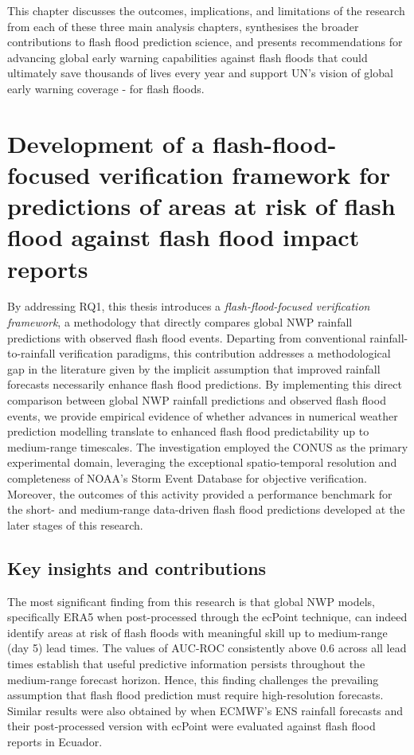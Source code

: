 This chapter discusses the outcomes, implications, and limitations of the research from each of these three main analysis chapters, synthesises the broader contributions to flash flood prediction science, and presents recommendations for advancing global early warning capabilities against flash floods that could ultimately save thousands of lives every year and support UN's vision of global early warning coverage - for flash floods.


\section{Development of a flash-flood-focused verification framework for predictions of areas at risk of flash flood against flash flood impact reports}

By addressing RQ1, this thesis introduces a \textit{flash-flood-focused verification framework}, a methodology that directly compares global NWP rainfall predictions with observed flash flood events. Departing from conventional rainfall-to-rainfall verification paradigms, this contribution addresses a methodological gap in the literature given by the implicit assumption that improved rainfall forecasts necessarily enhance flash flood predictions. By implementing this direct comparison between global NWP rainfall predictions and observed flash flood events, we provide empirical evidence of whether advances in numerical weather prediction modelling translate to enhanced flash flood predictability up to medium-range timescales. The investigation employed the CONUS as the primary experimental domain, leveraging the exceptional spatio-temporal resolution and completeness of NOAA's Storm Event Database for objective verification. Moreover, the outcomes of this activity provided a performance benchmark for the short- and medium-range data-driven flash flood predictions developed at the later stages of this research.


\subsection{Key insights and contributions}

The most significant finding from this research is that global NWP models, specifically ERA5 when post-processed through the ecPoint technique, can indeed identify areas at risk of flash floods with meaningful skill up to medium-range (day 5) lead times. The values of AUC-ROC consistently above 0.6 across all lead times establish that useful predictive information persists throughout the medium-range forecast horizon. Hence, this finding challenges the prevailing assumption that flash flood prediction must require high-resolution forecasts. Similar results were also obtained by \citet{Pillosu_2024} when ECMWF's ENS rainfall forecasts and their post-processed version with ecPoint were evaluated against flash flood reports in Ecuador. 


